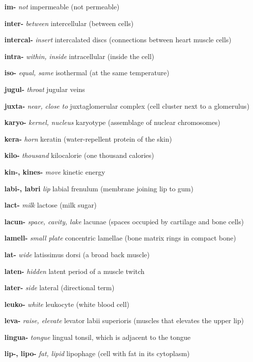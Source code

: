 \documentclass[10pt]{article}
\begin{document}
\begin{multicols}{2}
\begin{hangparas}{10pt}{1}
 \textbf{im-} \textit{not} impermeable (not permeable) \par
 \textbf{inter-} \textit{between} intercellular (between cells) \par
 \textbf{intercal-} \textit{insert} intercalated discs (connections between heart muscle cells) \par
 \textbf{intra-} \textit{within, inside} intracellular (inside the cell) \par
 \textbf{iso-} \textit{equal, same} isothermal (at the same temperature) \par
 \textbf{jugul-} \textit{throat} jugular veins \par
 \textbf{juxta-} \textit{near, close to} juxtaglomerular complex (cell cluster next to a glomerulus) \par
 \textbf{karyo-} \textit{kernel, nucleus} karyotype (assemblage of nuclear chromosomes) \par
 \textbf{kera-} \textit{horn} keratin (water-repellent protein of the skin) \par
 \textbf{kilo-} \textit{thousand} kilocalorie (one thousand calories) \par
 \textbf{kin-, kines-} \textit{move} kinetic energy \par
 \textbf{labi-, labri} \textit{lip} labial frenulum (membrane joining lip to gum) \par
 \textbf{lact-} \textit{milk} lactose (milk sugar) \par
 \textbf{lacun-} \textit{space, cavity, lake} lacunae (spaces occupied by cartilage and bone cells) \par
 \textbf{lamell-} \textit{small plate} concentric lamellae (bone matrix rings in compact bone) \par
 \textbf{lat-} \textit{wide} latissimus dorsi (a broad back muscle) \par
 \textbf{laten-} \textit{hidden} latent period of a muscle twitch \par
 \textbf{later-} \textit{side} lateral (directional term) \par
 \textbf{leuko-} \textit{white} leukocyte (white blood cell) \par
 \textbf{leva-} \textit{raise, elevate} levator labii superioris (muscles that elevates the upper lip) \par
 \textbf{lingua-} \textit{tongue} lingual tonsil, which is adjacent to the tongue \par
 \textbf{lip-, lipo-} \textit{fat, lipid} lipophage (cell with fat in its cytoplasm) \par

\end{hangparas}
\end{multicols}
\end{document}
